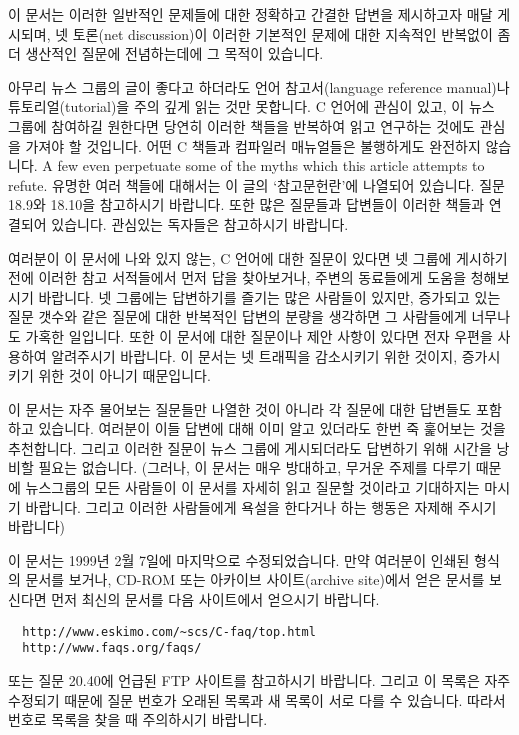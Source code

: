 이 문서는 이러한 일반적인 문제들에 대한 정확하고 간결한 답변을 제시하고자
매달 게시되며, 넷 토론(net discussion)이 이러한 기본적인
문제에 대한 지속적인 반복없이 좀 더 생산적인 질문에 전념하는데에
그 목적이 있습니다.

아무리 뉴스 그룹의 글이 좋다고 하더라도 언어 참고서(language reference
manual)나 튜토리얼(tutorial)을 주의 깊게 읽는 것만 못합니다.
C 언어에 관심이 있고, 이 뉴스 그룹에 참여하길 원한다면 당연히
이러한 책들을 반복하여 읽고 연구하는 것에도 관심을 가져야 할 것입니다.
어떤 C 책들과 컴파일러 매뉴얼들은 불행하게도 완전하지 않습니다.
A few even perpetuate some of the myths which this article attempts
to refute.  유명한 여러 책들에 대해서는 이 글의 `참고문헌란'에
나열되어 있습니다.  질문 18.9와 18.10을 참고하시기 바랍니다.
또한 많은 질문들과 답변들이 이러한 책들과 연결되어 있습니다.  관심있는 독자들은
참고하시기 바랍니다.

여러분이 이 문서에 나와 있지 않는, C 언어에 대한 질문이 있다면 넷 그룹에
게시하기 전에 이러한
참고 서적들에서 먼저 답을 찾아보거나, 주변의 동료들에게 도움을 청해보시기
바랍니다.  넷 그룹에는 답변하기를 즐기는 많은 사람들이 있지만,
증가되고 있는 질문 갯수와 같은 질문에 대한 반복적인 답변의 분량을
생각하면 그 사람들에게 너무나도 가혹한 일입니다.  또한 이 문서에 대한
질문이나 제안 사항이
있다면 전자 우편을 사용하여 알려주시기 바랍니다.  이 문서는 넷 트래픽을
감소시키기 위한 것이지, 증가시키기 위한 것이 아니기 때문입니다.

이 문서는 자주 물어보는 질문들만 나열한 것이 아니라 각 질문에 대한
답변들도 포함하고 있습니다.  여러분이 이들 답변에 대해 이미 알고
있더라도 한번 죽 훑어보는 것을 추천합니다.  그리고 이러한 질문이
뉴스 그룹에 게시되더라도 답변하기 위해 시간을 낭비할 필요는 없습니다.
(그러나, 이 문서는 매우 방대하고, 무거운 주제를 다루기 때문에 뉴스그룹의
모든 사람들이 이 문서를 자세히 읽고 질문할 것이라고 기대하지는
마시기 바랍니다.  그리고 이러한 사람들에게 욕설을 한다거나 하는
행동은 자제해 주시기 바랍니다)

이 문서는 1999년 2월 7일에 마지막으로 수정되었습니다.  만약
여러분이 인쇄된 형식의 문서를 보거나, CD-ROM 또는 아카이브 사이트(archive
site)에서 얻은 문서를 보신다면 먼저 최신의 문서를 다음 사이트에서
얻으시기 바랍니다.

\begin{verbatim}
  http://www.eskimo.com/~scs/C-faq/top.html
  http://www.faqs.org/faqs/
\end{verbatim}

또는 질문 20.40에 언급된 FTP 사이트를 참고하시기 바랍니다.  그리고 이
목록은 자주 수정되기 때문에 질문 번호가 오래된 목록과 새 목록이 서로
다를 수 있습니다.  따라서 번호로 목록을 찾을 때 주의하시기 바랍니다.

